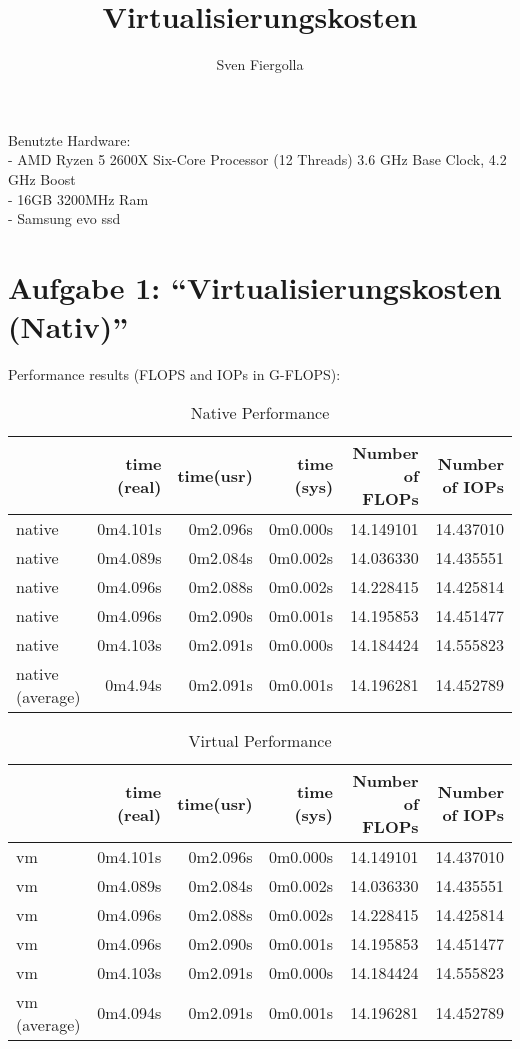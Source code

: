 \documentclass[14]{article}
\title{Virtualisierungskosten}
\author{Sven Fiergolla}
\begin{document}
\maketitle

\par{
Benutzte Hardware:\\
- AMD Ryzen 5 2600X Six-Core Processor (12 Threads) 3.6 GHz Base Clock, 4.2 GHz Boost\\
- 16GB 3200MHz Ram\\ 
- Samsung evo ssd\\
}

\section{Aufgabe 1: “Virtualisierungskosten (Nativ)”}
\par{
Performance results (FLOPS and IOPs in G-FLOPS): 

\begin{table}[h]
	\centering
	\begin{tabular}{l|r|r|r||r|r}	
		 & time (real) & time(usr) & time (sys) & Number of FLOPs & Number of IOPs\\
		\hline
		native & 0m4.101s & 0m2.096s & 0m0.000s & 14.149101 & 14.437010\\
		native & 0m4.089s & 0m2.084s & 0m0.002s & 14.036330 & 14.435551\\
		native & 0m4.096s & 0m2.088s & 0m0.002s & 14.228415 & 14.425814\\
		native & 0m4.096s & 0m2.090s & 0m0.001s & 14.195853 & 14.451477\\
		native & 0m4.103s & 0m2.091s & 0m0.000s & 14.184424 & 14.555823\\
		\hline
		native (average) & 0m4.94s & 0m2.091s & 0m0.001s & 14.196281 & 14.452789 \\
	\end{tabular}
	\caption{Native Performance}
	\label{tab:t1:Native Performance}
\end{table}

\begin{table}[h]
	\centering
	\begin{tabular}{l|r|r|r||r|r}	
		& time (real) & time(usr) & time (sys) & Number of FLOPs & Number of IOPs\\
		\hline
		vm & 0m4.101s & 0m2.096s & 0m0.000s & 14.149101 & 14.437010\\
		vm & 0m4.089s & 0m2.084s & 0m0.002s & 14.036330 & 14.435551\\
		vm & 0m4.096s & 0m2.088s & 0m0.002s & 14.228415 & 14.425814\\
		vm & 0m4.096s & 0m2.090s & 0m0.001s & 14.195853 & 14.451477\\
		vm & 0m4.103s & 0m2.091s & 0m0.000s & 14.184424 & 14.555823\\
		\hline
		vm (average) & 0m4.094s & 0m2.091s & 0m0.001s & 14.196281 & 14.452789 \\
	\end{tabular}
	\caption{Virtual Performance}
	\label{tab:t2:Virtual Performance}
\end{table}
}
\end{document}
